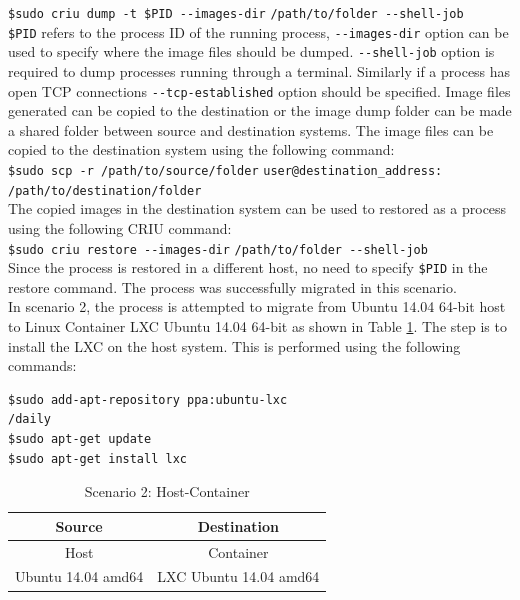 \documentclass[conference]{IEEEtran}
\begin{document}
\noindent\verb|$sudo criu dump -t $PID --images-dir| 
\verb|/path/to/folder --shell-job| \\

\noindent\verb|$PID| refers to the process ID of the running process, \verb|--images-dir| option can be used to specify where the image files should be dumped. \verb|--shell-job| option is required to dump processes running through a terminal. Similarly if a process has open TCP connections \verb|--tcp-established| option should be specified. Image files generated can be copied to the destination or the image dump folder can be made a shared folder between source and destination systems. The image files can be copied to the destination system using the following command:  \\

\noindent\verb|$sudo scp -r /path/to/source/folder|
\verb|user@destination_address:|
\verb|/path/to/destination/folder| \\

The copied images in the destination system can be used to restored as a process using the following CRIU command:\\

\noindent\verb|$sudo criu restore --images-dir| 
\verb|/path/to/folder --shell-job| \\

\noindent Since the process is restored in a different host, no need to specify \verb|$PID| in the restore command. The process was successfully migrated in this scenario. \\

In scenario 2, the process is attempted to migrate from Ubuntu 14.04 64-bit host to Linux Container LXC Ubuntu 14.04 64-bit as shown in Table \ref{table 3}. The step is to install the LXC on the host system. This is performed using the following commands:

\begin{verbatim}
$sudo add-apt-repository ppa:ubuntu-lxc
/daily
$sudo apt-get update
$sudo apt-get install lxc
\end{verbatim}

\begin{table}[htbp]
\caption{Scenario 2: Host-Container}
\begin{center}
\begin{tabular}{|c|c|}
\hline
\textbf{Source}&\textbf{Destination} \\
\cline{1-2} 
\hline
Host & Container  \\
Ubuntu 14.04 amd64 & LXC Ubuntu 14.04 amd64 \\
\hline
\end{tabular}
\label{table 3}
\end{center}
\end{table}
\end{document}
